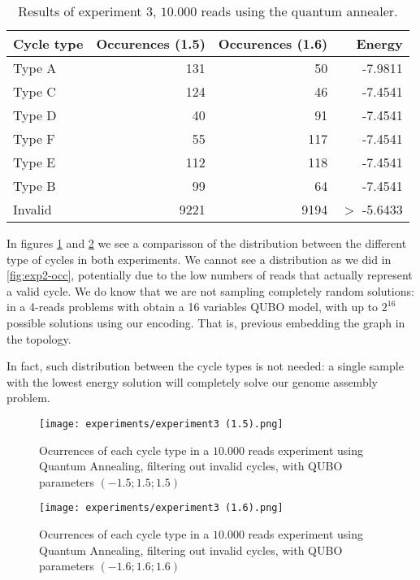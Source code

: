 \begin{table}[H]
	\centering
	\begin{tabular}{lrrr}
		\textbf{Cycle type} & \textbf{Occurences (1.5)} & \textbf{Occurences (1.6)} & \textbf{Energy} \\
		\hline
		Type A	& 131	& 50	& -7.9811	\\
		Type C	& 124	& 46	& -7.4541	\\
		Type D	& 40	& 91	& -7.4541	\\
		Type F	& 55	& 117	& -7.4541	\\
		Type E	& 112	& 118	& -7.4541	\\
		Type B	& 99	& 64	& -7.4541	\\    
		Invalid & 9221	& 9194	& $>$ -5.6433                         
	\end{tabular}
	\caption{Results of experiment 3, $10.000$ reads using the quantum annealer.}
	\label{tab:exp3}
\end{table}

In figures \ref{fig:exp3-occ1} and \ref{fig:exp3-occ2} we see a comparisson of the distribution between the different type of cycles in both experiments. We cannot see a distribution as we did in \ref{fig:exp2-occ}, potentially due to the low numbers of reads that actually represent a valid cycle. We do know that we are not sampling completely random solutions: in a 4-reads problems with obtain a 16 variables QUBO model, with up to $2^{16}$ possible solutions using our encoding. That is, previous embedding the graph in the topology.

In fact, such distribution between the cycle types is not needed: a single sample with the lowest energy solution will completely solve our genome assembly problem.

\begin{figure}[H]
	\texttt{[image: experiments/experiment3 (1.5).png]}
	\centering
	\caption{Ocurrences of each cycle type in a $10.000$ reads experiment using Quantum Annealing, filtering out invalid cycles, with QUBO parameters $(-1.5; 1.5; 1.5)$}
	\label{fig:exp3-occ1}
\end{figure}

\begin{figure}[H]
	\texttt{[image: experiments/experiment3 (1.6).png]}
	\centering
	\caption{Ocurrences of each cycle type in a $10.000$ reads experiment using Quantum Annealing, filtering out invalid cycles, with QUBO parameters $(-1.6; 1.6; 1.6)$}
	\label{fig:exp3-occ2}
\end{figure}

